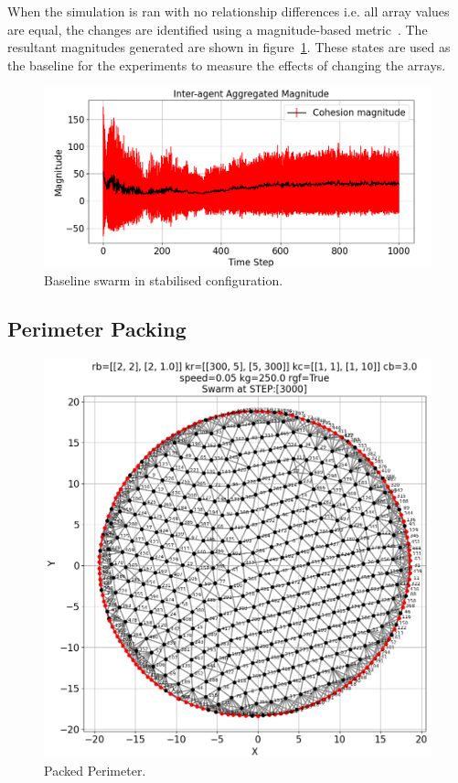 \documentclass[12pt,a4paper]{IEEEtran}
\begin{document}
When the simulation is ran with no relationship differences i.e. all array values are equal, the changes are identified using a magnitude-based metric~\cite{eliot2018metric}. The resultant magnitudes generated are shown in figure~\ref{fig:baselineMagnitude}. These states are used as the baseline for the experiments to measure the effects of changing the arrays.

\begin{figure}[H]
	\begin{center}
		\includegraphics[width=1.0\linewidth]{figures/baselineMagnitude}
	\end{center}
	\caption{Baseline swarm in stabilised configuration. \label{fig:baselineMagnitude}}
\end{figure}

\subsection{Perimeter Packing}\label{sec:perimCompress}

\begin{figure}[ht]
	\begin{center}
		\includegraphics[width=1.0\linewidth]{figures/tightPerim}
	\end{center}
	\caption{Packed Perimeter. \label{fig:tightPerim}}
\end{figure}
\end{document}
